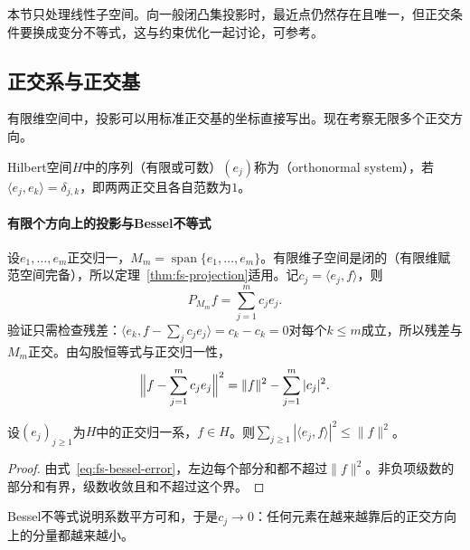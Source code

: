 本节只处理线性子空间。向一般闭凸集投影时，最近点仍然存在且唯一，但正交条件要换成变分不等式，这与约束优化一起讨论，可参考。

\subsection{正交系与正交基}
\label{sec:fs-orthonormal-bases}

有限维空间中，投影可以用标准正交基的坐标直接写出。现在考察无限多个正交方向。

\begin{definition}[正交归一系]
\label{def:fs-orthonormal}
Hilbert空间$H$中的序列（有限或可数）$(e_j)$称为（orthonormal system），若$\langle e_j,e_k\rangle=\delta_{j,k}$，即两两正交且各自范数为$1$。
\end{definition}

\paragraph{有限个方向上的投影与Bessel不等式}
设$e_1,\ldots,e_m$正交归一，$M_m=\operatorname{span}\{e_1,\ldots,e_m\}$。有限维子空间是闭的（有限维赋范空间完备），所以定理~\ref{thm:fs-projection}适用。记$c_j=\langle e_j,f\rangle$，则
\begin{equation}
 P_{M_m}f=\sum_{j=1}^mc_je_j .
 \label{eq:fs-finite-projection}
\end{equation}
验证只需检查残差：$\langle e_k,f-\sum_jc_je_j\rangle=c_k-c_k=0$对每个$k\leq m$成立，所以残差与$M_m$正交。由勾股恒等式与正交归一性，
\begin{equation}
 \Bigl\|f-\sum_{j=1}^mc_je_j\Bigr\|^2=\|f\|^2-\sum_{j=1}^m|c_j|^2 .
 \label{eq:fs-bessel-error}
\end{equation}

\begin{theorem}[Bessel不等式]
\label{thm:fs-bessel}
设$(e_j)_{j\geq1}$为$H$中的正交归一系，$f\in H$。则$\sum_{j\geq1}|\langle e_j,f\rangle|^2\leq\|f\|^2$。
\end{theorem}

\begin{proof}
由式~\eqref{eq:fs-bessel-error}，左边每个部分和都不超过$\|f\|^2$。非负项级数的部分和有界，级数收敛且和不超过这个界。
\end{proof}

Bessel不等式说明系数平方可和，于是$c_j\to0$：任何元素在越来越靠后的正交方向上的分量都越来越小。

